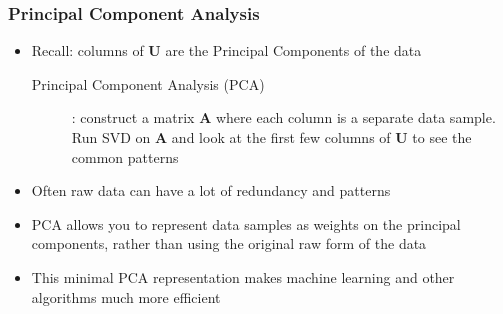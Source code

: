 \documentclass[letterpaper,12pt]{article}
\newcommand{\matr}[1]{\mathbf{#1}}
\begin{document}
\subsubsection{Principal Component Analysis}
\begin{itemize}
 \item Recall: columns of $\matr{U}$ are the Principal Components of the data
       \begin{description}
        \item[Principal Component Analysis (PCA)]: construct a matrix $\matr{A}$ where each column is a separate data sample. Run SVD on $\matr{A}$ and look at the first few columns of $\matr{U}$ to see the common patterns
       \end{description}
 \item Often raw data can have a lot of redundancy and patterns
 \item PCA allows you to represent data samples as weights on the principal components, rather than using the original raw form of the data
 \item This minimal PCA representation makes machine learning and other algorithms much more efficient
\end{itemize}
\end{document}

